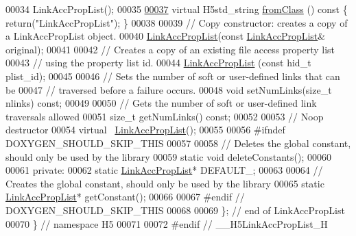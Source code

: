 \begin{DoxyCode}
00034         LinkAccPropList();
00035 
\hyperlink{class_h5_1_1_link_acc_prop_list_ae3031353168d39a801fb7ffd59bc9c7b}{00037}         \textcolor{keyword}{virtual} H5std\_string \hyperlink{class_h5_1_1_link_acc_prop_list_ae3031353168d39a801fb7ffd59bc9c7b}{fromClass} ()\textcolor{keyword}{ const }\{ \textcolor{keywordflow}{return}(\textcolor{stringliteral}{"LinkAccPropList"}); \}
00038 
00039         \textcolor{comment}{// Copy constructor: creates a copy of a LinkAccPropList object.}
00040         \hyperlink{class_h5_1_1_link_acc_prop_list}{LinkAccPropList}(\textcolor{keyword}{const} \hyperlink{class_h5_1_1_link_acc_prop_list}{LinkAccPropList}& original);
00041 
00042         \textcolor{comment}{// Creates a copy of an existing file access property list}
00043         \textcolor{comment}{// using the property list id.}
00044         \hyperlink{class_h5_1_1_link_acc_prop_list}{LinkAccPropList} (\textcolor{keyword}{const} hid\_t plist\_id);
00045 
00046         \textcolor{comment}{// Sets the number of soft or user-defined links that can be}
00047         \textcolor{comment}{// traversed before a failure occurs.}
00048         \textcolor{keywordtype}{void} setNumLinks(\textcolor{keywordtype}{size\_t} nlinks) \textcolor{keyword}{const};
00049 
00050         \textcolor{comment}{// Gets the number of soft or user-defined link traversals allowed}
00051         \textcolor{keywordtype}{size\_t} getNumLinks() \textcolor{keyword}{const};
00052 
00053         \textcolor{comment}{// Noop destructor}
00054         \textcolor{keyword}{virtual} ~\hyperlink{class_h5_1_1_link_acc_prop_list}{LinkAccPropList}();
00055 
00056 \textcolor{preprocessor}{#ifndef DOXYGEN\_SHOULD\_SKIP\_THIS}
00057 
00058         \textcolor{comment}{// Deletes the global constant, should only be used by the library}
00059         \textcolor{keyword}{static} \textcolor{keywordtype}{void} deleteConstants();
00060 
00061     \textcolor{keyword}{private}:
00062         \textcolor{keyword}{static} \hyperlink{class_h5_1_1_link_acc_prop_list}{LinkAccPropList}* DEFAULT\_;
00063 
00064         \textcolor{comment}{// Creates the global constant, should only be used by the library}
00065         \textcolor{keyword}{static} \hyperlink{class_h5_1_1_link_acc_prop_list}{LinkAccPropList}* getConstant();
00066 
00067 \textcolor{preprocessor}{#endif // DOXYGEN\_SHOULD\_SKIP\_THIS}
00068 
00069 \}; \textcolor{comment}{// end of LinkAccPropList}
00070 \} \textcolor{comment}{// namespace H5}
00071 
00072 \textcolor{preprocessor}{#endif // \_\_H5LinkAccPropList\_H}
\end{DoxyCode}
